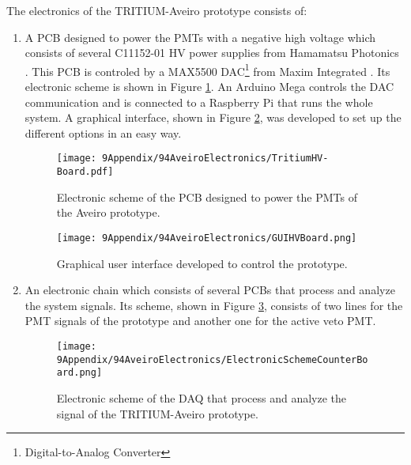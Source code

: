 The electronics of the TRITIUM-Aveiro prototype consists of:
\begin{enumerate}
\item{} A PCB designed to power the PMTs with a negative high voltage which consists of several C11152-01  HV power supplies from Hamamatsu Photonics \cite{PowerSupplyAveiroDataSheet}. This PCB is controled by a MAX5500 DAC\footnote{Digital-to-Analog Converter} from Maxim Integrated \cite{MAX5500DataSheet}. Its electronic scheme is shown in Figure \ref{fig:ElectronicSchemeHVBoard}.  An Arduino Mega controls the DAC communication and is connected to a Raspberry Pi that runs the whole system. A graphical interface, shown in Figure \ref{fig:GUIHVBoard}, was developed to set up the different options in an easy way.

\begin{figure}[h]
\centering
\texttt{[image: 9Appendix/94AveiroElectronics/TritiumHV-Board.pdf]}
\caption{Electronic scheme of the PCB designed to power the PMTs of the Aveiro prototype. \label{fig:ElectronicSchemeHVBoard}}
\end{figure}

\begin{figure}[h]
\centering
\texttt{[image: 9Appendix/94AveiroElectronics/GUIHVBoard.png]}
\caption{Graphical user interface developed to control the prototype. \label{fig:GUIHVBoard}}
\end{figure}

\item{} An electronic chain which consists of several PCBs that process and analyze the system signals. Its scheme, shown in Figure \ref{fig:ElectronicSchemCounterBoard}, consists of two lines for the PMT signals of the prototype and another one for the active veto PMT.

\begin{figure}[h]
\centering
\texttt{[image: 9Appendix/94AveiroElectronics/ElectronicSchemeCounterBoard.png]}
\caption{Electronic scheme of the DAQ that process and analyze the signal of the TRITIUM-Aveiro prototype. \label{fig:ElectronicSchemCounterBoard}}
\end{figure}


\end{enumerate}
